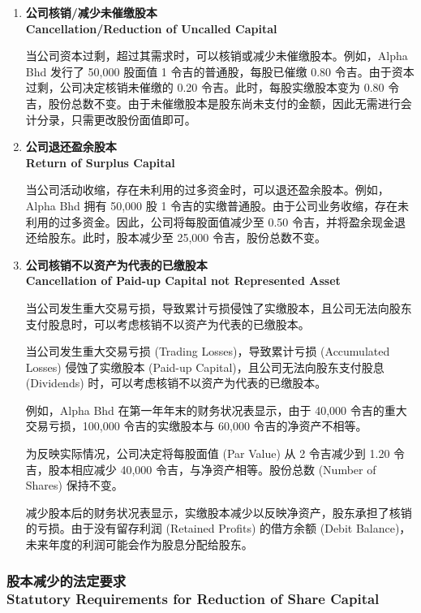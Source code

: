 \documentclass{article}
\begin{document}
\begin{enumerate}
    \item \textbf{公司核销/减少未催缴股本\\Cancellation/Reduction of Uncalled Capital}
    
    当公司资本过剩，超过其需求时，可以核销或减少未催缴股本。例如，Alpha Bhd 发行了 50,000 股面值 1 令吉的普通股，每股已催缴 0.80 令吉。由于资本过剩，公司决定核销未催缴的 0.20 令吉。此时，每股实缴股本变为 0.80 令吉，股份总数不变。由于未催缴股本是股东尚未支付的金额，因此无需进行会计分录，只需更改股份面值即可。

    \item \textbf{公司退还盈余股本\\Return of Surplus Capital}
    
    当公司活动收缩，存在未利用的过多资金时，可以退还盈余股本。例如，Alpha Bhd 拥有 50,000 股 1 令吉的实缴普通股。由于公司业务收缩，存在未利用的过多资金。因此，公司将每股面值减少至 0.50 令吉，并将盈余现金退还给股东。此时，股本减少至 25,000 令吉，股份总数不变。

    \item \textbf{公司核销不以资产为代表的已缴股本\\Cancellation of Paid-up Capital not Represented Asset}
    
    当公司发生重大交易亏损，导致累计亏损侵蚀了实缴股本，且公司无法向股东支付股息时，可以考虑核销不以资产为代表的已缴股本。

    当公司发生重大交易亏损 (Trading Losses)，导致累计亏损 (Accumulated Losses) 侵蚀了实缴股本 (Paid-up Capital)，且公司无法向股东支付股息 (Dividends) 时，可以考虑核销不以资产为代表的已缴股本。

    例如，Alpha Bhd 在第一年年末的财务状况表显示，由于 40,000 令吉的重大交易亏损，100,000 令吉的实缴股本与 60,000 令吉的净资产不相等。
    
    为反映实际情况，公司决定将每股面值 (Par Value) 从 2 令吉减少到 1.20 令吉，股本相应减少 40,000 令吉，与净资产相等。股份总数 (Number of Shares) 保持不变。
    
    减少股本后的财务状况表显示，实缴股本减少以反映净资产，股东承担了核销的亏损。由于没有留存利润 (Retained Profits) 的借方余额 (Debit Balance)，未来年度的利润可能会作为股息分配给股东。
    
\end{enumerate}

\subsubsection{股本减少的法定要求\\Statutory Requirements for Reduction of Share Capital}
\end{document}
